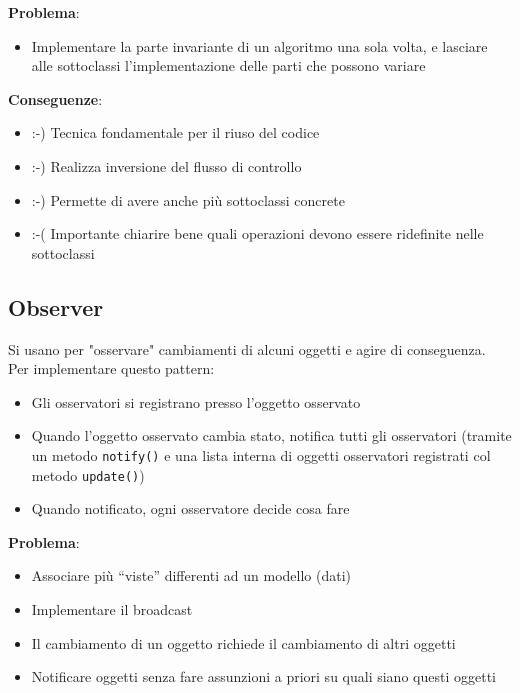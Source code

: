 \vspace{4mm}
\noindent \textbf{Problema}:
\begin{itemize}
    \item Implementare la parte invariante di un algoritmo una sola volta, e lasciare alle sottoclassi l’implementazione delle parti che possono variare
\end{itemize}

\vspace{4mm}
\noindent \textbf{Conseguenze}:
\begin{itemize}
    \item :-) Tecnica fondamentale per il riuso del codice
    \item :-) Realizza inversione del flusso di controllo
    \item :-) Permette di avere anche più sottoclassi concrete
    \item :-( Importante chiarire bene quali operazioni devono essere ridefinite nelle sottoclassi
\end{itemize}

\break
\subsection{Observer}
Si usano per "osservare" cambiamenti di alcuni oggetti e agire di conseguenza.\\
Per implementare questo pattern:
\begin{itemize}
    \item Gli osservatori si registrano presso l’oggetto osservato
    \item Quando l’oggetto osservato cambia stato, notifica tutti gli osservatori (tramite un metodo \texttt{notify()} e una lista interna di oggetti osservatori registrati col metodo \texttt{update()})
    \item Quando notificato, ogni osservatore decide cosa fare
\end{itemize}

\vspace{4mm}
\noindent \textbf{Problema}:
\begin{itemize}
    \item Associare più “viste” differenti ad un modello (dati)
    \item Implementare il broadcast
    \item Il cambiamento di un oggetto richiede il cambiamento di altri oggetti
    \item Notificare oggetti senza fare assunzioni a priori su quali siano questi oggetti
\end{itemize}

